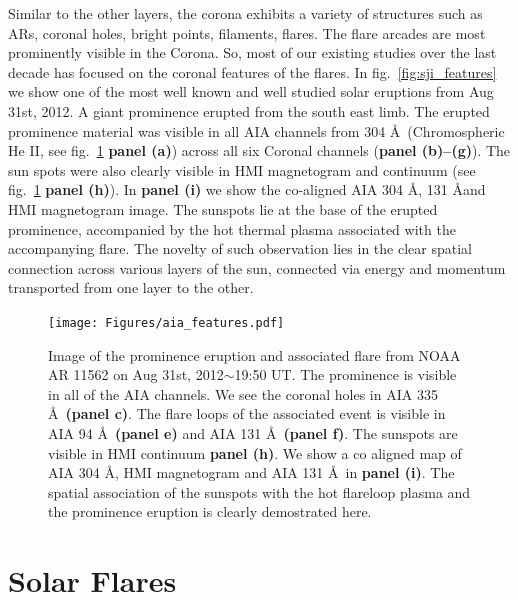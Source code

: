 Similar to the other layers, the corona exhibits a variety of structures such as ARs, coronal holes, bright points, filaments, flares. The flare arcades are most prominently visible in the Corona. So, most of our existing studies over the last decade has focused on the coronal features of the flares. In fig.~\ref{fig:sji_features} we show one of the most well known and well studied solar eruptions from Aug 31st, 2012. A giant prominence erupted from the south east limb. The erupted prominence material was visible in all AIA channels from 304 \AA~(Chromospheric He II, see fig.~\ref{fig:aia-feature} \textbf{panel (a)}) across all six Coronal channels (\textbf{panel (b){--}(g)}). The sun spots were also clearly visible in HMI magnetogram and continuum (see fig.~\ref{fig:aia-feature} \textbf{panel (h)}). In \textbf{panel (i)} we show the co-aligned AIA 304 \AA, 131 \AA and HMI magnetogram image. The sunspots lie at the base of the erupted prominence, accompanied by the hot thermal plasma associated with the accompanying flare. The novelty of such observation lies in the clear spatial connection across various layers of the sun, connected via energy and momentum transported from one layer to the other. 

\begin{figure}
    \centering
    \texttt{[image: Figures/aia\_features.pdf]}
    \caption{Image of the prominence eruption and associated flare from NOAA AR 11562 on Aug 31st, 2012$\sim$19:50 UT. The prominence is visible in all of the AIA channels. We see the coronal holes in AIA 335 \AA~\textbf{(panel c)}. The flare loops of the associated event is visible in AIA 94 \AA~\textbf{(panel e)} and AIA 131 \AA~\textbf{(panel f)}. The sunspots are visible in HMI continuum \textbf{panel (h)}. We show a co aligned map of AIA 304 \AA, HMI magnetogram and AIA 131 \AA~in \textbf{panel (i)}. The spatial association of the sunspots with the hot flareloop plasma and the prominence eruption is clearly demostrated here. }
    \label{fig:aia-feature}
\end{figure}




\section{Solar Flares}\label{sol_flr}

